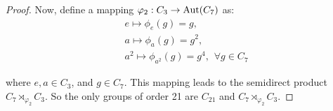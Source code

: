 \begin{proof}
Now, define a mapping $\varphi_2 : C_3 \rightarrow \operatorname{Aut}(C_7)$ as:
\begin{align*}
    & e \mapsto \phi_{e}(g) = g, \\
    & a \mapsto \phi_{a}(g)
= g^2, \\
& a^2 \mapsto \phi_{a^2}(g) = g^4, \hspace{5pt} \forall g \in C_7
\end{align*}

where $e, a \in C_3$, and $g \in C_7$. This mapping leads to the semidirect product $C_7 \rtimes_{\varphi_2} C_3$. So the only groups of order 21 are $C_{21}$ and $C_7 \rtimes_{\varphi_2} C_3$.
\end{proof}
